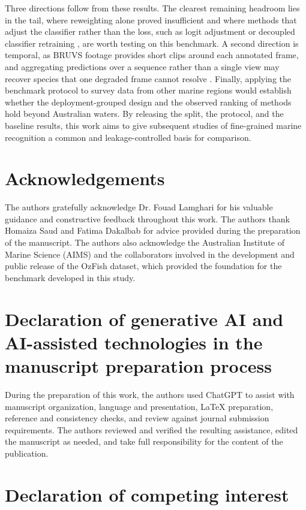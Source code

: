 \documentclass[preprint,12pt]{elsarticle}
\begin{document}
Three directions follow from these results. The clearest remaining
headroom lies in the tail, where reweighting alone proved insufficient
and where methods that adjust the classifier rather than the loss, such
as logit adjustment or decoupled classifier retraining
\citep{ref65}, are worth testing on this
benchmark. A second direction is temporal, as BRUVS footage provides
short clips around each annotated frame, and aggregating predictions
over a sequence rather than a single view may recover species that one
degraded frame cannot resolve \citep{ref50}.
Finally, applying the benchmark protocol to survey data from other
marine regions \citep{ref13} would establish
whether the deployment-grouped design and the observed ranking of
methods hold beyond Australian waters. By releasing the split, the
protocol, and the baseline results, this work aims to give subsequent
studies of fine-grained marine recognition a common and
leakage-controlled basis for comparison.

\section{Acknowledgements}\label{acknowledgements}

The authors gratefully acknowledge Dr. Fouad Lamghari for his valuable
guidance and constructive feedback throughout this work. The authors
thank Homaiza Saud and Fatima Dakalbab for advice provided during the
preparation of the manuscript. The authors
also acknowledge the Australian Institute of Marine Science (AIMS) and
the collaborators involved in the development and public release of the
OzFish dataset, which provided the foundation for the benchmark
developed in this study.

\section*{Declaration of generative AI and AI-assisted technologies in the manuscript preparation process}

During the preparation of this work, the authors used ChatGPT to assist
with manuscript organization, language and presentation, LaTeX
preparation, reference and consistency checks, and review against
journal submission requirements. The authors reviewed and verified the
resulting assistance, edited the manuscript as needed, and take full
responsibility for the content of the publication.

\section*{Declaration of competing interest}
\end{document}

